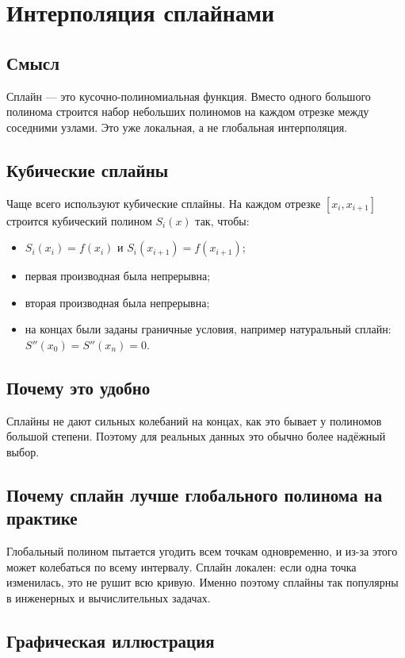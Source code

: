 \documentclass[12pt,a4paper]{article}
\begin{document}
\section{Интерполяция сплайнами}
\subsection{Смысл}
Сплайн --- это кусочно-полиномиальная функция. Вместо одного большого полинома строится набор небольших полиномов на каждом отрезке между соседними узлами. Это уже локальная, а не глобальная интерполяция.

\subsection{Кубические сплайны}
Чаще всего используют кубические сплайны. На каждом отрезке $[x_i,x_{i+1}]$ строится кубический полином $S_i(x)$ так, чтобы:
\begin{itemize}
\item $S_i(x_i)=f(x_i)$ и $S_i(x_{i+1})=f(x_{i+1})$;
\item первая производная была непрерывна;
\item вторая производная была непрерывна;
\item на концах были заданы граничные условия, например натуральный сплайн: $S''(x_0)=S''(x_n)=0$.
\end{itemize}

\subsection{Почему это удобно}
Сплайны не дают сильных колебаний на концах, как это бывает у полиномов большой степени. Поэтому для реальных данных это обычно более надёжный выбор.

\subsection{Почему сплайн лучше глобального полинома на практике}
Глобальный полином пытается угодить всем точкам одновременно, и из-за этого может колебаться по всему интервалу. Сплайн локален: если одна точка изменилась, это не рушит всю кривую. Именно поэтому сплайны так популярны в инженерных и вычислительных задачах.

\subsection{Графическая иллюстрация}
\begin{center}
\end{center}
\end{document}
